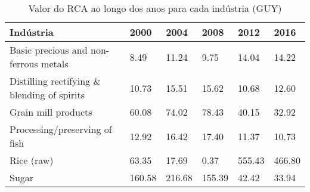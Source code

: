 \begin{table}
\centering
\caption{Valor do RCA ao longo dos anos para cada indústria (GUY)}
\begin{tabular}{p{6cm}p{1.5cm}p{1.5cm}p{1.5cm}p{1.5cm}p{1.5cm}}
\toprule
                                  Indústria &   2000 &   2004 &   2008 &   2012 &   2016 \\
\midrule
      Basic precious and non-ferrous metals &   8.49 &  11.24 &   9.75 &  14.04 &  14.22 \\
Distilling rectifying \& blending of spirits &  10.73 &  15.51 &  15.62 &  10.68 &  12.60 \\
                        Grain mill products &  60.08 &  74.02 &  78.43 &  40.15 &  32.92 \\
              Processing/preserving of fish &  12.92 &  16.42 &  17.40 &  11.37 &  10.73 \\
                                 Rice (raw) &  63.35 &  17.69 &   0.37 & 555.43 & 466.80 \\
                                      Sugar & 160.58 & 216.68 & 155.39 &  42.42 &  33.94 \\
\bottomrule
\end{tabular}
\end{table}
